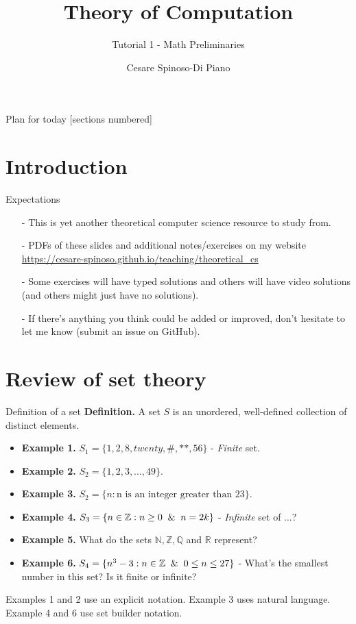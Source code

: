 \documentclass[10pt]{beamer}
\title{Theory of Computation}
\subtitle{Tutorial 1 - Math Preliminaries}
\author{Cesare Spinoso-Di Piano}
\date{}
\begin{document}
\maketitle

\begin{frame}{Plan for today}
    [sections numbered]
    \tableofcontents[hideallsubsections]
\end{frame}

\section{Introduction}


\begin{frame}{Expectations}
    \begin{itemize}
        \item[-] This is yet another theoretical computer science resource to study from.
        \item[-] PDFs of these slides and additional notes/exercises on my website \href{https://cesare-spinoso.github.io/teaching/theoretical_cs}{https://cesare-spinoso.github.io/teaching/theoretical\_cs}
        \item[-] Some exercises will have typed solutions and others will have video solutions (and others might just have no solutions).
        \item[-] If there's anything you think could be added or improved, don't hesitate to let me know (submit an issue on GitHub).
    \end{itemize}
\end{frame}

\section{Review of set theory}

\begin{frame}{Definition of a set}
    \textbf{Definition.} A set $S$ is an unordered, well-defined collection of distinct elements.
    \begin{itemize}
        \item \textbf{Example 1.} $S_1 = \{1,2,8,twenty,\#,**,56 \}$ - \textit{Finite} set.
        \item \textbf{Example 2.} $S_2 = \{1,2,3,...,49\}$.
        \item \textbf{Example 3.} $S_2 = \{n: \text{n is an integer greater than 23}\}$.
        \item \textbf{Example 4.} $S_3 = \{n \in \mathbb{Z}:n \geq 0 \And n=2k \}$ - \textit{Infinite} set of ...?
        \item \textbf{Example 5.} What do the sets $\mathbb{N},\mathbb{Z}, \mathbb{Q}$ and $\mathbb{R}$ represent?
        \item \textbf{Example 6.} $S_4 = \{n^3 - 3: n \in \mathbb{Z} \And 0 \leq n \leq 27 \}$ - What's the smallest number in this set? Is it finite or infinite?
    \end{itemize}
    Examples 1 and 2 use an explicit notation. Example 3 uses natural language. Example 4 and 6 use set builder notation.
\end{frame}
\end{document}
